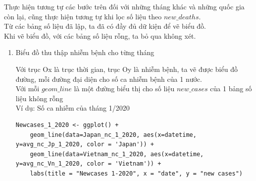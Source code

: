 \documentclass[a4paper]{article}
\theoremstyle{definition}
\begin{document}
Thực hiện tương tự các bước trên đối với những tháng khác và những quốc gia còn lại, cũng thực hiện tương tự khi lọc số liệu theo $new\_deaths$.\\
Từ các bảng số liệu đã lập, ta đã có đầy đủ dữ kiện để vẽ biểu đồ.\\
Khi vẽ biểu đồ, với các bảng số liệu rỗng, ta bỏ qua không xét.
\begin{enumerate}[1)]
    \item Biểu đồ thu thập nhiễm bệnh cho từng tháng
    
	Với trục Ox là trục thời gian, trục Oy là nhiễm bệnh, ta vẽ được biểu đồ đường, mỗi đường đại diện cho số ca nhiễm bệnh của 1 nước.\\
	\indent Với mỗi $geom\_line$ là một đường biểu thị cho số liệu $new\_cases$ của 1 bảng số liệu không rỗng\\[8pt]
	Ví dụ: Số ca nhiễm của tháng 1/2020\\
	\begin{lstlisting}
Newcases_1_2020 <- ggplot() + 
	geom_line(data=Japan_nc_1_2020, aes(x=datetime, y=avg_nc_Jp_1_2020, color = 'Japan')) +
	geom_line(data=Vietnam_nc_1_2020, aes(x=datetime, y=avg_nc_Vn_1_2020, color = 'Vietnam')) +
	labs(title = "Newcases 1-2020", x = "date", y = "new cases")
	\end{lstlisting}
	

\end{enumerate}
\end{document}
